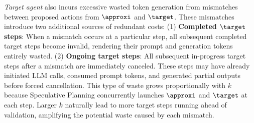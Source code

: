 \textit{Target agent} also incurs excessive wasted token generation from mismatches between proposed actions from $\approxi$ and $\target$. These mismatches introduce two additional sources of redundant costs: (1) \textbf{Completed $\target$ steps}: When a mismatch occurs at a particular step, all subsequent completed target steps become invalid, rendering their  prompt and generation tokens entirely wasted. (2) \textbf{Ongoing target steps}: All subsequent in-progress target steps after a mismatch are immediately canceled. These steps may have already initiated LLM calls, consumed prompt tokens, and generated partial outputs before forced cancellation. This type of waste grows proportionally with $k$ because Speculative Planning concurrently launches $\approxi$ and $\target$ at each step. Larger $k$ naturally lead to more target steps running ahead of validation, amplifying the potential waste caused by each mismatch.




